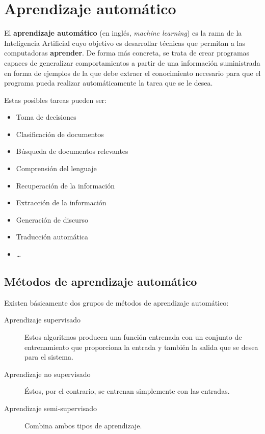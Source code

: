 
\chapter{Aprendizaje automático}

El \textbf{aprendizaje automático} (en inglés, \emph{machine learning}) es la rama de la Inteligencia Artificial cuyo objetivo es desarrollar técnicas que permitan a las computadoras \textbf{aprender}. De forma más concreta, se trata de crear programas capaces de generalizar comportamientos a partir de una información suministrada en forma de ejemplos de la que debe extraer el conocimiento necesario para que el programa pueda realizar automáticamente la tarea que se le desea.

Estas posibles tareas pueden ser:
\begin{itemize}
\item Toma de decisiones
\item Clasificación de documentos
\item Búsqueda de documentos relevantes
\item Comprensión del lenguaje
\item Recuperación de la información
\item Extracción de la información
\item Generación de discurso
\item Traducción automática
\item \ldots
\end{itemize}

\section{Métodos de aprendizaje automático}

Existen básicamente dos grupos de métodos de aprendizaje automático:
\nopagebreak
\begin{description}
\item[Aprendizaje supervisado] Estos algoritmos producen una función entrenada con un conjunto de entrenamiento que proporciona la entrada y también la salida que se desea para el sistema.
\item[Aprendizaje no supervisado] Éstos, por el contrario, se entrenan simplemente con las entradas.
\item[Aprendizaje semi-supervisado] Combina ambos tipos de aprendizaje.
\end{description}

